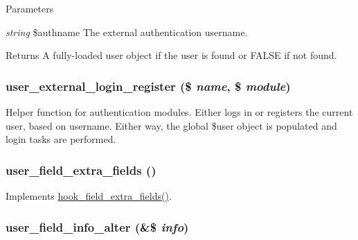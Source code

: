 \begin{DoxyParams}{Parameters}
\item[{\em string}]\$authname The external authentication username.\end{DoxyParams}
\begin{DoxyReturn}{Returns}
A fully-\/loaded user object if the user is found or FALSE if not found. 
\end{DoxyReturn}
\hypertarget{user_8module_af4a2f1223554e9d79172c92273b81f2b}{
\subsubsection[{user\_\-external\_\-login\_\-register}]{\setlength{\rightskip}{0pt plus 5cm}user\_\-external\_\-login\_\-register (\$ {\em name}, \/  \$ {\em module})}}
\label{user_8module_af4a2f1223554e9d79172c92273b81f2b}
Helper function for authentication modules. Either logs in or registers the current user, based on username. Either way, the global \$user object is populated and login tasks are performed. \hypertarget{user_8module_a63f13e48d71e123e4e0a893b5dce6748}{
\subsubsection[{user\_\-field\_\-extra\_\-fields}]{\setlength{\rightskip}{0pt plus 5cm}user\_\-field\_\-extra\_\-fields ()}}
\label{user_8module_a63f13e48d71e123e4e0a893b5dce6748}
Implements \hyperlink{group__hooks_ga7100332aa5b4d5f6ba72534599d133e5}{hook\_\-field\_\-extra\_\-fields()}. \hypertarget{user_8module_ae2c0ec71e6b747b92374db56ec39a559}{
\subsubsection[{user\_\-field\_\-info\_\-alter}]{\setlength{\rightskip}{0pt plus 5cm}user\_\-field\_\-info\_\-alter (\&\$ {\em info})}}
\label{user_8module_ae2c0ec71e6b747b92374db56ec39a559}
